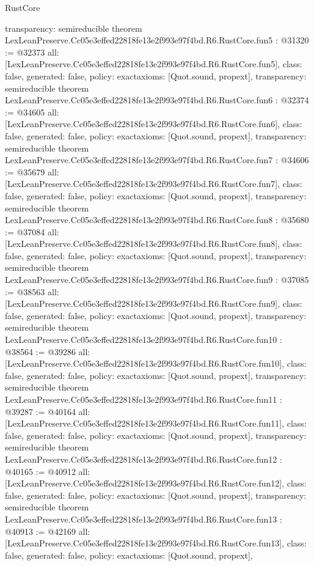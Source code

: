\begin{lexlean}{RustCore}
\begin{coremodule}
{  transparency: semireducible
}
theorem LexLeanPreserve.Cc05e3effed22818fe13e2f993e97f4bd.R6.RustCore.fun5 : @31320 := @32373 {
  all: [LexLeanPreserve.Cc05e3effed22818fe13e2f993e97f4bd.R6.RustCore.fun5],
  class: false,
  generated: false,
  policy: exact{axioms: [Quot.sound, propext]},
  transparency: semireducible
}
theorem LexLeanPreserve.Cc05e3effed22818fe13e2f993e97f4bd.R6.RustCore.fun6 : @32374 := @34605 {
  all: [LexLeanPreserve.Cc05e3effed22818fe13e2f993e97f4bd.R6.RustCore.fun6],
  class: false,
  generated: false,
  policy: exact{axioms: [Quot.sound, propext]},
  transparency: semireducible
}
theorem LexLeanPreserve.Cc05e3effed22818fe13e2f993e97f4bd.R6.RustCore.fun7 : @34606 := @35679 {
  all: [LexLeanPreserve.Cc05e3effed22818fe13e2f993e97f4bd.R6.RustCore.fun7],
  class: false,
  generated: false,
  policy: exact{axioms: [Quot.sound, propext]},
  transparency: semireducible
}
theorem LexLeanPreserve.Cc05e3effed22818fe13e2f993e97f4bd.R6.RustCore.fun8 : @35680 := @37084 {
  all: [LexLeanPreserve.Cc05e3effed22818fe13e2f993e97f4bd.R6.RustCore.fun8],
  class: false,
  generated: false,
  policy: exact{axioms: [Quot.sound, propext]},
  transparency: semireducible
}
theorem LexLeanPreserve.Cc05e3effed22818fe13e2f993e97f4bd.R6.RustCore.fun9 : @37085 := @38563 {
  all: [LexLeanPreserve.Cc05e3effed22818fe13e2f993e97f4bd.R6.RustCore.fun9],
  class: false,
  generated: false,
  policy: exact{axioms: [Quot.sound, propext]},
  transparency: semireducible
}
theorem LexLeanPreserve.Cc05e3effed22818fe13e2f993e97f4bd.R6.RustCore.fun10 : @38564 := @39286 {
  all: [LexLeanPreserve.Cc05e3effed22818fe13e2f993e97f4bd.R6.RustCore.fun10],
  class: false,
  generated: false,
  policy: exact{axioms: [Quot.sound, propext]},
  transparency: semireducible
}
theorem LexLeanPreserve.Cc05e3effed22818fe13e2f993e97f4bd.R6.RustCore.fun11 : @39287 := @40164 {
  all: [LexLeanPreserve.Cc05e3effed22818fe13e2f993e97f4bd.R6.RustCore.fun11],
  class: false,
  generated: false,
  policy: exact{axioms: [Quot.sound, propext]},
  transparency: semireducible
}
theorem LexLeanPreserve.Cc05e3effed22818fe13e2f993e97f4bd.R6.RustCore.fun12 : @40165 := @40912 {
  all: [LexLeanPreserve.Cc05e3effed22818fe13e2f993e97f4bd.R6.RustCore.fun12],
  class: false,
  generated: false,
  policy: exact{axioms: [Quot.sound, propext]},
  transparency: semireducible
}
theorem LexLeanPreserve.Cc05e3effed22818fe13e2f993e97f4bd.R6.RustCore.fun13 : @40913 := @42169 {
  all: [LexLeanPreserve.Cc05e3effed22818fe13e2f993e97f4bd.R6.RustCore.fun13],
  class: false,
  generated: false,
  policy: exact{axioms: [Quot.sound, propext]},
}
\end{coremodule}
\end{lexlean}
